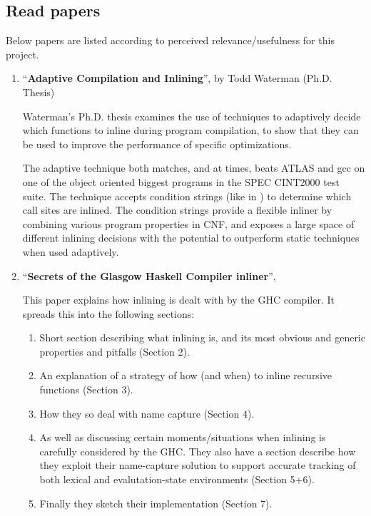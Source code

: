\subsection{Read papers}

Below papers are listed according to perceived relevance/usefulness for this
project.\\

\begin{enumerate}

	\item ``\textbf{Adaptive Compilation and Inlining}'', by Todd
Waterman (Ph.D. Thesis)

Waterman's Ph.D. thesis \cite{AdaptvCompilAndInlingWaterman} examines the use of
techniques to adaptively decide which functions to inline during program
compilation, to show that they can be used to improve the performance of
specific optimizations.

The adaptive technique both matches, and at times, beats ATLAS  and gcc on one of the object oriented biggest programs in the SPEC
CINT2000 test suite. The technique accepts condition strings (like in
\cite{AutoTuningJavaHeuristics}) to determine which call sites are inlined. The
condition strings provide a flexible inliner by combining various program
properties in CNF, and exposes a large space of different inlining decisions
with the potential to outperform static techniques when used adaptively.

	\item ``\textbf{Secrets of the Glasgow Haskell Compiler inliner}'',
\cite{GHCPaper}

This paper explains how inlining is dealt with by the GHC compiler. It spreads
this into the following sections:
\begin{enumerate}
	\item Short section describing what inlining is, and its most obvious and
generic properties and pitfalls (Section 2).
	\item An explanation of a strategy of how (and when) to inline recursive
functions (Section 3).
	\item How they so deal with name capture (Section 4).
	\item As well as discussing certain moments/situations when inlining is
carefully considered by the GHC. They also have a section describe how they
exploit their name-capture solution to support accurate tracking of both lexical
and evalutation-state environments (Section 5+6).
	\item Finally they sketch their implementation (Section 7).
\end{enumerate}


\end{enumerate}
